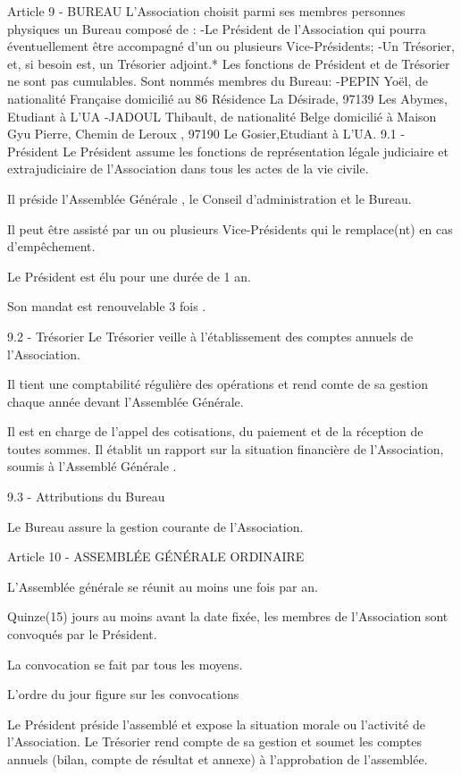 \documentclass[a4paper]{article}
\begin{document}
Article 9 - BUREAU
L'Association choisit parmi ses membres personnes physiques un Bureau composé de :
    -Le Président de l'Association qui pourra éventuellement être accompagné d'un ou plusieurs Vice-Présidents;
    -Un Trésorier, et, si besoin est, un Trésorier adjoint.*
Les fonctions de Président et de Trésorier ne sont pas cumulables.
Sont nommés membres du Bureau:
    -PEPIN Yoël, de nationalité Française domicilié au 86 Résidence La Désirade, 97139 Les Abymes, Etudiant à L'UA
    -JADOUL Thibault, de nationalité Belge domicilié à Maison Gyu Pierre, Chemin de Leroux , 97190 Le Gosier,Etudiant à L'UA.
9.1 - Président
Le Président assume les fonctions de représentation légale judiciaire et extrajudiciaire de l'Association dans tous les actes de la vie civile.

Il préside l'Assemblée Générale , le Conseil d'administration et le Bureau.

Il peut être assisté par un ou plusieurs Vice-Présidents qui le remplace(nt) en cas d'empêchement.

Le Président est élu pour une durée de 1 an.

Son mandat est renouvelable 3 fois .


9.2 - Trésorier
Le Trésorier veille à l'établissement des comptes annuels de l'Association.

Il tient une comptabilité régulière des opérations et rend comte de sa gestion chaque année devant l'Assemblée Générale.

Il est en charge de l'appel des cotisations, du paiement et de la réception de toutes sommes. Il établit un rapport sur la situation financière de l'Association, soumis à l'Assemblé Générale .

9.3 - Attributions du Bureau

Le Bureau assure la gestion courante de l'Association.

Article 10 - ASSEMBLÉE GÉNÉRALE ORDINAIRE

L'Assemblée générale se réunit au moins une fois par an.

Quinze(15) jours au moins avant la date fixée, les membres de l'Association sont convoqués par le Président.

La convocation se fait par tous les moyens.

L'ordre du jour figure sur les convocations

Le Président préside l'assemblé et expose la situation morale ou l'activité de l'Association. Le Trésorier rend compte de sa gestion et soumet les comptes annuels (bilan, compte de résultat et annexe) à l'approbation de l'assemblée.
\end{document}
